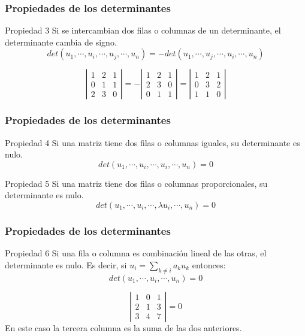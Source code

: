 \documentclass[aspectratio=169]{beamer}
\begin{document}
  
 \begin{frame}
  \frametitle{Propiedades de los determinantes}
   \begin{block}{Propiedad 3}
   Si se intercambian dos filas o columnas de un determinante, el determinante cambia de signo.
   \[det(u_1, \cdots,u_i, \cdots, u_j, \cdots , u_n) = - det(u_1, \cdots,u_j, \cdots, u_i, \cdots , u_n) \]
\end{block}

\[ \left|\begin{array}{ccc}1 & 2 & 1 \\0 & 1 & 1 \\2 & 3 & 0\end{array}\right|
= - \left|\begin{array}{ccc}1 & 2 & 1 \\2 & 3 & 0\\0 & 1 & 1 \end{array}\right|
= \left|\begin{array}{ccc}1 & 2 & 1 \\0 & 3 & 2\\1 & 1 & 0 \end{array}\right|
\]
  \end{frame} 
  
  
   \begin{frame}
  \frametitle{Propiedades de los determinantes}
   \begin{block}{Propiedad 4}
   Si una matriz tiene dos filas o columnas iguales, su determinante es nulo.
   \[det(u_1, \cdots,u_i, \cdots, u_i, \cdots , u_n) = 0 \]
\end{block}

  \begin{block}{Propiedad 5}
   Si una matriz tiene dos filas o columnas proporcionales, su determinante es nulo.
   \[det(u_1, \cdots,u_i, \cdots, \lambda u_i, \cdots , u_n) = 0 \]
\end{block}
  \end{frame} 
  
  
     \begin{frame}
  \frametitle{Propiedades de los determinantes}
   \begin{block}{Propiedad 6}
   Si una fila o columna es combinaci\'on lineal de las otras, el determinante es nulo. Es decir, si $u_i = \sum_{k\neq i} a_k u_k$ entonces:
   \[det(u_1, \cdots,u_i, \cdots, u_n) = 0 \]
   
\end{block}

\[ \left|\begin{array}{ccc}1 & 0 & 1 \\2 & 1 & 3 \\3 & 4 & 7\end{array}\right| = 0\]
En este caso la tercera columna es la suma de las dos anteriores.
   \end{frame} 
  
\end{document}
